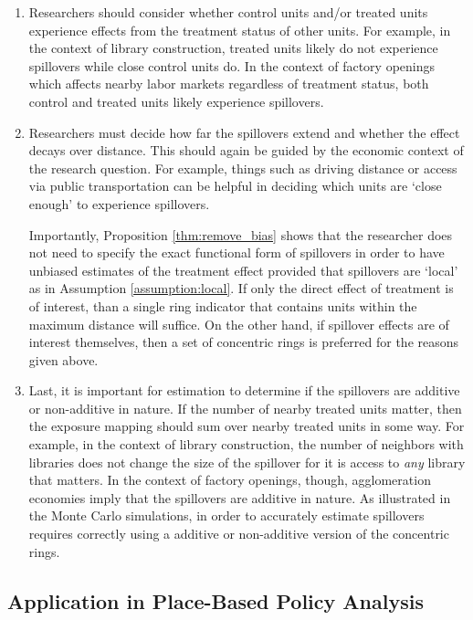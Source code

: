 \documentclass[11pt]{article}
\begin{document}
\begin{enumerate}
    \item Researchers should consider whether control units and/or treated units experience effects from the treatment status of other units. For example, in the context of library construction, treated units likely do not experience spillovers while close control units do. In the context of factory openings which affects nearby labor markets regardless of treatment status, both control and treated units likely experience spillovers. 
    
    \item Researchers must decide how far the spillovers extend and whether the effect decays over distance. This should again be guided by the economic context of the research question. For example, things such as driving distance or access via public transportation can be helpful in deciding which units are `close enough' to experience spillovers. 

    Importantly, Proposition \ref{thm:remove_bias} shows that the researcher does not need to specify the exact functional form of spillovers in order to have unbiased estimates of the treatment effect provided that spillovers are `local' as in Assumption \ref{assumption:local}. If only the direct effect of treatment is of interest, than a single ring indicator that contains units within the maximum distance will suffice. On the other hand, if spillover effects are of interest themselves, then a set of concentric rings is preferred for the reasons given above. 

    \item Last, it is important for estimation to determine if the spillovers are additive or non-additive in nature. If the number of nearby treated units matter, then the exposure mapping should sum over nearby treated units in some way. For example, in the context of library construction, the number of neighbors with libraries does not change the size of the spillover for it is access to \textit{any} library that matters. In the context of factory openings, though, agglomeration economies imply that the spillovers are additive in nature. As illustrated in the Monte Carlo simulations, in order to accurately estimate spillovers requires correctly using a additive or non-additive version of the concentric rings. 
\end{enumerate}

\subsection{Application in Place-Based Policy Analysis}
\label{sec:tva}
\end{document}
